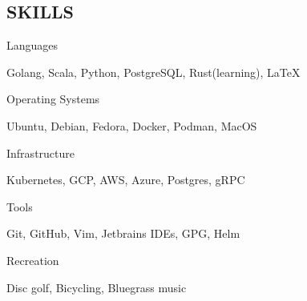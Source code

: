 \documentclass[line, margin, 10.5pt]{res}
\begin{document}
\begin{resume}
\section{\small SKILLS}
\begin{compactdesc}
\item[Languages] \hfill \begin{inparaenum} {Golang, Scala, Python, PostgreSQL, Rust(learning), \LaTeX} \end{inparaenum}
\item[Operating Systems] \hfill \begin{inparaenum} {Ubuntu, Debian, Fedora, Docker, Podman, MacOS} \end{inparaenum}
\item[Infrastructure] \hfill \begin{inparaenum} {Kubernetes, GCP, AWS, Azure, Postgres, gRPC} \end{inparaenum}
\item[Tools] \hfill \begin{inparaenum} {Git, GitHub, Vim, Jetbrains IDEs, GPG, Helm} \end{inparaenum}
\item[Recreation] \hfill \begin{inparaenum} {Disc golf, Bicycling, Bluegrass music} \end{inparaenum}
\end{compactdesc}

\end{resume}
\end{document}
